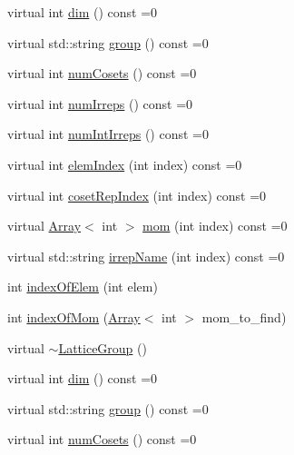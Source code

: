 \begin{DoxyCompactItemize}
virtual int \mbox{\hyperlink{structHadron_1_1LatticeGroup_abd8415698323796ef6a8605796ee3bea}{dim}} () const =0
\item 
virtual std\+::string \mbox{\hyperlink{structHadron_1_1LatticeGroup_a82208a322bf1b1db489f16af38e70087}{group}} () const =0
\item 
virtual int \mbox{\hyperlink{structHadron_1_1LatticeGroup_afc76430f36a3a041f86d4058c59bf55e}{num\+Cosets}} () const =0
\item 
virtual int \mbox{\hyperlink{structHadron_1_1LatticeGroup_a3edaca488144b5d2a9cf73fe653add34}{num\+Irreps}} () const =0
\item 
virtual int \mbox{\hyperlink{structHadron_1_1LatticeGroup_af2aa7b39222bf188389356eefcef7547}{num\+Int\+Irreps}} () const =0
\item 
virtual int \mbox{\hyperlink{structHadron_1_1LatticeGroup_afb8e3ee60de059f75bce1044c694e1e8}{elem\+Index}} (int index) const =0
\item 
virtual int \mbox{\hyperlink{structHadron_1_1LatticeGroup_a7e3b9b5e2f596e6c40d64aa939a3ad6c}{coset\+Rep\+Index}} (int index) const =0
\item 
virtual \mbox{\hyperlink{classXMLArray_1_1Array}{Array}}$<$ int $>$ \mbox{\hyperlink{structHadron_1_1LatticeGroup_ad577b65041dd9a6e84b1f3bd49cb8fce}{mom}} (int index) const =0
\item 
virtual std\+::string \mbox{\hyperlink{structHadron_1_1LatticeGroup_a4bc5620218c2a73157e19bc4451fe746}{irrep\+Name}} (int index) const =0
\item 
int \mbox{\hyperlink{structHadron_1_1LatticeGroup_a4a664d3cbcc8a3b1634e4eb8434f1199}{index\+Of\+Elem}} (int elem)
\item 
int \mbox{\hyperlink{structHadron_1_1LatticeGroup_a49927e4a4d386b2e3eed6f3b5c1ee76d}{index\+Of\+Mom}} (\mbox{\hyperlink{classXMLArray_1_1Array}{Array}}$<$ int $>$ mom\+\_\+to\+\_\+find)
\item 
virtual \mbox{\hyperlink{structHadron_1_1LatticeGroup_a8265941ad6e64b658d2eb904e7d85d62}{$\sim$\+Lattice\+Group}} ()
\item 
virtual int \mbox{\hyperlink{structHadron_1_1LatticeGroup_abd8415698323796ef6a8605796ee3bea}{dim}} () const =0
\item 
virtual std\+::string \mbox{\hyperlink{structHadron_1_1LatticeGroup_a82208a322bf1b1db489f16af38e70087}{group}} () const =0
\item 
virtual int \mbox{\hyperlink{structHadron_1_1LatticeGroup_afc76430f36a3a041f86d4058c59bf55e}{num\+Cosets}} () const =0

\end{DoxyCompactItemize}
